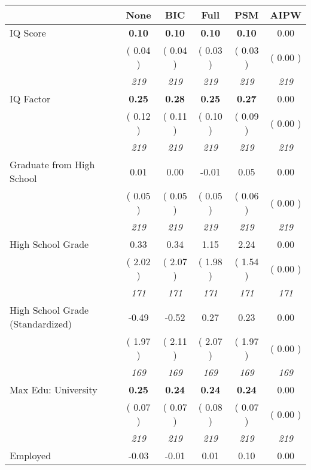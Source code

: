 \begin{tabular}{l c c c c c}
\toprule
 & None & BIC & Full & PSM & AIPW \\
\midrule
IQ Score & \textbf{      0.10 } & \textbf{      0.10 } & \textbf{      0.10 } & \textbf{     0.10} &      0.00 \\
& (     0.04 ) & (     0.04 ) & (     0.03 ) & (     0.03 ) & (     0.00 ) \\
& \textit{ 219 } & \textit{ 219 } & \textit{ 219 } & \textit{ 219 } & \textit{ 219 } \\
IQ Factor & \textbf{      0.25 } & \textbf{      0.28 } & \textbf{      0.25 } & \textbf{     0.27} &      0.00 \\
& (     0.12 ) & (     0.11 ) & (     0.10 ) & (     0.09 ) & (     0.00 ) \\
& \textit{ 219 } & \textit{ 219 } & \textit{ 219 } & \textit{ 219 } & \textit{ 219 } \\
Graduate from High School &      0.01 &      0.00 &     -0.01 &      0.05 &      0.00 \\
& (     0.05 ) & (     0.05 ) & (     0.05 ) & (     0.06 ) & (     0.00 ) \\
& \textit{ 219 } & \textit{ 219 } & \textit{ 219 } & \textit{ 219 } & \textit{ 219 } \\
High School Grade &      0.33 &      0.34 &      1.15 &      2.24 &      0.00 \\
& (     2.02 ) & (     2.07 ) & (     1.98 ) & (     1.54 ) & (     0.00 ) \\
& \textit{ 171 } & \textit{ 171 } & \textit{ 171 } & \textit{ 171 } & \textit{ 171 } \\
High School Grade (Standardized) &     -0.49 &     -0.52 &      0.27 &      0.23 &      0.00 \\
& (     1.97 ) & (     2.11 ) & (     2.07 ) & (     1.97 ) & (     0.00 ) \\
& \textit{ 169 } & \textit{ 169 } & \textit{ 169 } & \textit{ 169 } & \textit{ 169 } \\
Max Edu: University & \textbf{      0.25 } & \textbf{      0.24 } & \textbf{      0.24 } & \textbf{     0.24} &      0.00 \\
& (     0.07 ) & (     0.07 ) & (     0.08 ) & (     0.07 ) & (     0.00 ) \\
& \textit{ 219 } & \textit{ 219 } & \textit{ 219 } & \textit{ 219 } & \textit{ 219 } \\
Employed &     -0.03 &     -0.01 &      0.01 &      0.10 &      0.00 \\

\end{tabular}
